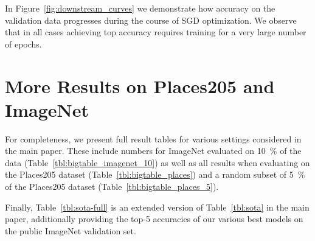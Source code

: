 \documentclass[10pt,twocolumn,letterpaper]{article}
\begin{document}
In Figure~\ref{fig:downstream_curves} we demonstrate how accuracy on the validation data progresses
during the course of SGD optimization.
We observe that in all cases achieving top accuracy requires training for a very large number of epochs.


\section{More Results on Places205 and ImageNet}

For completeness, we present full result tables for various settings considered in the main paper. 
These include numbers for ImageNet evaluated on \SI{10}{\percent} of the data (Table~\ref{tbl:bigtable_imagenet_10}) as well as all results when evaluating on the Places205 dataset (Table~\ref{tbl:bigtable_places}) and a random subset of \SI{5}{\percent} of the Places205 dataset (Table~\ref{tbl:bigtable_places_5}).

Finally, Table~\ref{tbl:sota-full} is an extended version of Table~\ref{tbl:sota} in the main paper, additionally providing the top-5 accuracies of our various best models on the public ImageNet validation set.
\end{document}
